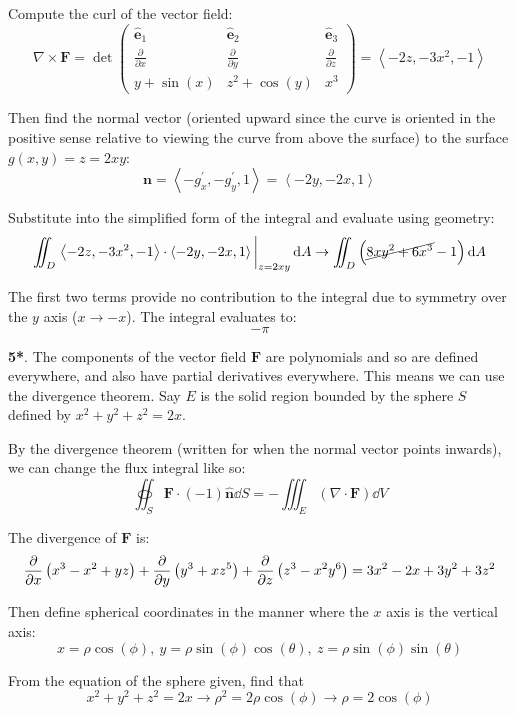 \documentclass[11pt]{article}
\newcommand{\br}[1]{\left(#1\right)}
\begin{document}
Compute the curl of the vector field:
$$\nabla \times \mathbf{F} = \det \begin{pmatrix}
    \hat{\mathbf{e}}_1 & \hat{\mathbf{e}}_2 & \hat{\mathbf{e}}_3 \\
    \frac{\partial}{\partial x} & \frac{\partial}{\partial y} & \frac{\partial}{\partial z} \\
    y+\sin(x) & z^2+\cos(y) & x^3
\end{pmatrix} = \left\langle -2z, -3x^2 ,-1 \right \rangle$$

Then find the normal vector (oriented upward since the curve is oriented in the positive sense relative to viewing the curve from above the surface) to the surface $g(x,y) = z = 2xy$:
$$\mathbf{n} = \left\langle -g^{\prime}_x, -g^{\prime}_y ,1 \right\rangle = \left\langle -2y, -2x ,1 \right\rangle$$

Substitute into the simplified form of the integral and evaluate using geometry:
$$\iint_D \eval{\left\langle -2z, -3x^2 ,-1 \right \rangle \cdot \left\langle -2y, -2x ,1 \right\rangle}_{z = 2xy} \dd{A} \to \iint_D \br{\cancel{8 x y^2 + 6x^3} -1} \dd{A}$$

The first two terms provide no contribution to the integral due to symmetry over the $y$ axis ($x\to -x$). The integral evaluates to: $$\boxed{-\pi}$$

\noindent\makebox[\linewidth]{\rule{19.1cm}{0.4pt}}

\textbf{5*}. The components of the vector field $\mathbf{F}$ are polynomials and so are defined everywhere, and also have partial derivatives everywhere. This means we can use the divergence theorem. Say $E$ is the solid region bounded by the sphere $S$ defined by $x^2 + y^2+ z^2 = 2x$.

By the divergence theorem (written for when the normal vector points inwards), we can change the flux integral like so:
$$\oiint_S \mathbf{F}\cdot (-1)\hat{\mathbf{n}}\dd{S} = -\iiint_E \br{\nabla \cdot \mathbf{F}} \dd{V}$$

The divergence of $\mathbf{F}$ is:
$$\pdv{x}\br{x^3-x^2+yz} + \pdv{y}\br{y^3+xz^5} + \pdv{z}\br{z^3-x^2y^6} = 3x^2-2x+3y^2+3z^2$$

Then define spherical coordinates in the manner where the $x$ axis is the vertical axis:
$$x = \rho \cos(\phi), ~ y = \rho\sin(\phi)\cos(\theta), ~ z = \rho \sin(\phi)\sin(\theta)$$

From the equation of the sphere given, find that $$x^2 + y^2+ z^2 = 2x \to \rho^{2} = 2\rho\cos(\phi) \to \rho = 2\cos(\phi)$$
\end{document}
